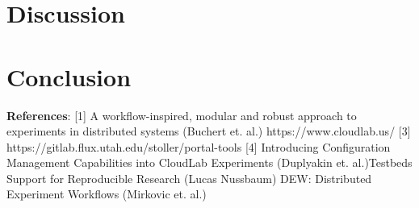 \documentclass[11pt,twocolumn,letterpaper]{article}
\begin{document}
\section{Discussion}
\section{Conclusion}
\textbf{References}: 
    [1] A workflow-inspired, modular and robust approach to experiments in distributed systems (Buchert et. al.)
\newline
    [2] https://www.cloudlab.us/
    [3] https://gitlab.flux.utah.edu/stoller/portal-tools
    [4] Introducing Configuration Management Capabilities into CloudLab Experiments (Duplyakin et. al.)\newline
    [5] Testbeds Support for Reproducible Research (Lucas Nussbaum) \newline
    [6] DEW: Distributed Experiment Workflows (Mirkovic et. al.)\newline
\end{document}

